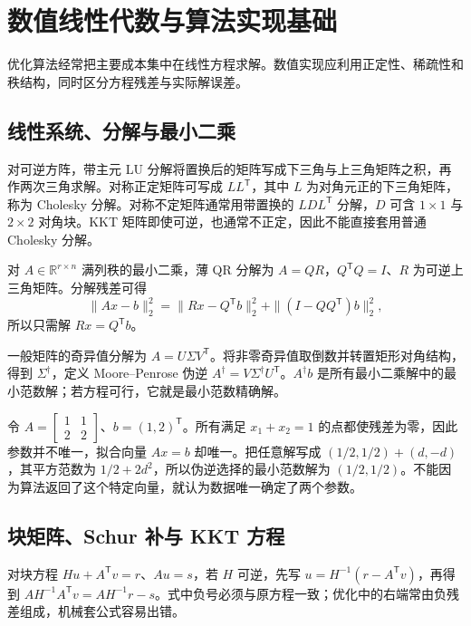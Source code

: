 \setcounter{chapter}{2} %
\chapter{数值线性代数与算法实现基础}
\label{app:co-numerical}

优化算法经常把主要成本集中在线性方程求解。数值实现应利用正定性、稀疏性和秩结构，同时区分方程残差与实际解误差。

\section{线性系统、分解与最小二乘}

对可逆方阵，带主元 LU 分解将置换后的矩阵写成下三角与上三角矩阵之积，再作两次三角求解。对称正定矩阵可写成 $LL^{\mathsf T}$，其中 $L$ 为对角元正的下三角矩阵，称为 Cholesky 分解。对称不定矩阵通常用带置换的 $LDL^{\mathsf T}$ 分解，$D$ 可含 $1\times1$ 与 $2\times2$ 对角块。KKT 矩阵即使可逆，也通常不正定，因此不能直接套用普通 Cholesky 分解。

对 $A\in\mathbb R^{r\times n}$ 满列秩的最小二乘，薄 QR 分解为 $A=QR$，$Q^{\mathsf T}Q=I$、$R$ 为可逆上三角矩阵。分解残差可得
\[
 \|Ax-b\|_2^2=\|Rx-Q^{\mathsf T}b\|_2^2+\|(I-QQ^{\mathsf T})b\|_2^2,
\]
所以只需解 $Rx=Q^{\mathsf T}b$。

一般矩阵的奇异值分解为 $A=U\Sigma V^{\mathsf T}$。将非零奇异值取倒数并转置矩形对角结构，得到 $\Sigma^\dagger$，定义 Moore--Penrose 伪逆 $A^\dagger=V\Sigma^\dagger U^{\mathsf T}$。$A^\dagger b$ 是所有最小二乘解中的最小范数解；若方程可行，它就是最小范数精确解。

\begin{example}[秩亏时拟合值可以唯一而参数不唯一]
令 $A=\left[\begin{smallmatrix}1&1\\2&2\end{smallmatrix}\right]$、$b=(1,2)^{\mathsf T}$。所有满足 $x_1+x_2=1$ 的点都使残差为零，因此参数并不唯一，拟合向量 $Ax=b$ 却唯一。把任意解写成 $(1/2,1/2)+(d,-d)$，其平方范数为 $1/2+2d^2$，所以伪逆选择的最小范数解为 $(1/2,1/2)$。不能因为算法返回了这个特定向量，就认为数据唯一确定了两个参数。
\end{example}

\section{块矩阵、Schur 补与 KKT 方程}

对块方程 $Hu+A^{\mathsf T}v=r$、$Au=s$，若 $H$ 可逆，先写 $u=H^{-1}(r-A^{\mathsf T}v)$，再得到 $AH^{-1}A^{\mathsf T}v=AH^{-1}r-s$。式中负号必须与原方程一致；优化中的右端常由负残差组成，机械套公式容易出错。

